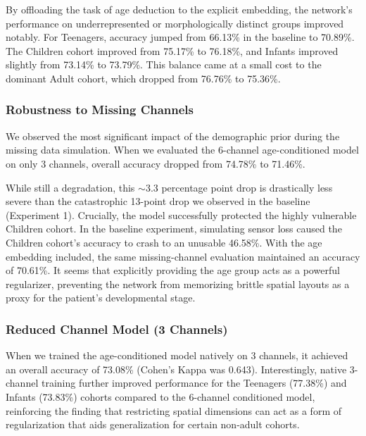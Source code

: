 By offloading the task of age deduction to the explicit embedding, the network's performance on underrepresented or morphologically distinct groups improved notably. For Teenagers, accuracy jumped from 66.13\% in the baseline to 70.89\%. The Children cohort improved from 75.17\% to 76.18\%, and Infants improved slightly from 73.14\% to 73.79\%. This balance came at a small cost to the dominant Adult cohort, which dropped from 76.76\% to 75.36\%.

\subsubsection*{Robustness to Missing Channels}
We observed the most significant impact of the demographic prior during the missing data simulation. When we evaluated the 6-channel age-conditioned model on only 3 channels, overall accuracy dropped from 74.78\% to 71.46\%. 

While still a degradation, this $\sim$3.3 percentage point drop is drastically less severe than the catastrophic 13-point drop we observed in the baseline (Experiment 1). Crucially, the model successfully protected the highly vulnerable Children cohort. In the baseline experiment, simulating sensor loss caused the Children cohort's accuracy to crash to an unusable 46.58\%. With the age embedding included, the same missing-channel evaluation maintained an accuracy of 70.61\%. It seems that explicitly providing the age group acts as a powerful regularizer, preventing the network from memorizing brittle spatial layouts as a proxy for the patient's developmental stage.

\subsubsection*{Reduced Channel Model (3 Channels)}
When we trained the age-conditioned model natively on 3 channels, it achieved an overall accuracy of 73.08\% (Cohen's Kappa was 0.643). Interestingly, native 3-channel training further improved performance for the Teenagers (77.38\%) and Infants (73.83\%) cohorts compared to the 6-channel conditioned model, reinforcing the finding that restricting spatial dimensions can act as a form of regularization that aids generalization for certain non-adult cohorts.

